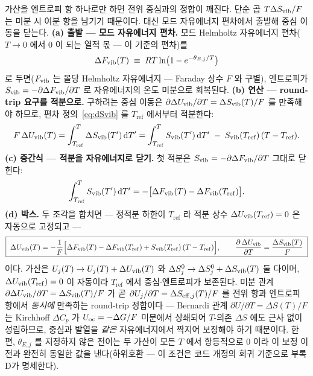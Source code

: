 가산을 엔트로피 항 하나로만 하면 전위 중심과의 정합이 깨진다. 단순 곱 $T\Delta S_{\mathrm{vib}}/F$ 는 미분 시 여분
항을 남기기 때문이다. 대신 모드 자유에너지 편차에서 출발해 중심 이동을 닫는다.
\textbf{(a) 출발 --- 모드 자유에너지 편차.} 모드 Helmholtz 자유에너지 편차($T\!\to\!0$ 에서 $0$ 이 되는
열적 몫 --- 이 기준의 편차)를
\[
\Delta F_{\mathrm{vib}}(T)\;\equiv\; RT\ln\bigl(1-e^{-\theta_{E,j}/T}\bigr)
\]
로 두면($F_{\mathrm{vib}}$ 는 몰당 Helmholtz 자유에너지 --- Faraday 상수 $F$ 와 구별), 엔트로피가 $S_{\mathrm{vib}}=-\partial
\Delta F_{\mathrm{vib}}/\partial T$ 로 자유에너지의 온도 미분으로 회복된다. \textbf{(b) 연산 --- round-trip 요구를
적분으로.} 구하려는 중심 이동은 $\partial\Delta U_{\mathrm{vib}}/\partial T=\Delta S_{\mathrm{vib}}(T)/F$ 를 만족해야 하므로,
편차 정의~\eqref{eq:dSvib} 를 $T_\mathrm{ref}$ 에서부터 적분한다:
\[
F\,\Delta U_{\mathrm{vib}}(T)=\int_{T_\mathrm{ref}}^{T}\Delta S_{\mathrm{vib}}(T')\,\mathrm{d} T'
=\int_{T_\mathrm{ref}}^{T}S_{\mathrm{vib}}(T')\,\mathrm{d} T'\;-\;S_{\mathrm{vib}}(T_\mathrm{ref})\,(T-T_\mathrm{ref}).
\]
\textbf{(c) 중간식 --- 적분을 자유에너지로 닫기.} 첫 적분은 $S_{\mathrm{vib}}=-\partial\Delta F_{\mathrm{vib}}/\partial T$
그대로 닫힌다:
\[
\int_{T_\mathrm{ref}}^{T}S_{\mathrm{vib}}(T')\,\mathrm{d} T'
=-\bigl[\Delta F_{\mathrm{vib}}(T)-\Delta F_{\mathrm{vib}}(T_\mathrm{ref})\bigr].
\]
\textbf{(d) 박스.} 두 조각을 합치면 --- 정적분 하한이 $T_\mathrm{ref}$ 라 적분 상수
$\Delta U_{\mathrm{vib}}(T_\mathrm{ref})=0$ 은 자동으로 고정되고 ---
\begin{equation}
\boxed{\;
\Delta U_{\mathrm{vib}}(T)=-\frac1F\Bigl[\Delta F_{\mathrm{vib}}(T)-\Delta F_{\mathrm{vib}}(T_\mathrm{ref})+S_{\mathrm{vib}}(T_\mathrm{ref})\,(T-T_\mathrm{ref})\Bigr],
\qquad
\frac{\partial\,\Delta U_{\mathrm{vib}}}{\partial T}=\frac{\Delta S_{\mathrm{vib}}(T)}{F}\;}
\label{eq:dUvib}
\end{equation}
이다. 가산은 $U_j(T)\to U_j(T)+\Delta U_{\mathrm{vib}}(T)$ 와 $\Delta S^0_j\to\Delta S^0_j+\Delta S_{\mathrm{vib}}(T)$ 둘 다이며,
$\Delta U_{\mathrm{vib}}(T_\mathrm{ref})=0$ 이 자동이라 $T_\mathrm{ref}$ 에서 중심$\cdot$엔트로피가 보존된다. 미분 관계
$\partial\Delta U_{\mathrm{vib}}/\partial T=\Delta S_{\mathrm{vib}}(T)/F$ 가 곧 $\partial U_j/\partial T=\Delta S_{\mathrm{eff},j}(T)/F$ 를 전위
항과 엔트로피 항에서 \emph{동시에} 만족하는 round-trip 정합이다 --- Bernardi 관계 $\partial U/\partial
T=\Delta S(T)/F$ 는 Kirchhoff $\Delta C_p$ 가 $U_{\mathrm{oc}}={-}\Delta G/F$ 미분에서 상쇄되어 $T$-의존 $\Delta S$ 에도
근사 없이 성립하므로, 중심과 발열을 \emph{같은} 자유에너지에서 짝지어 보정해야 하기 때문이다. 한편,
$\theta_{E,j}$ 를 지정하지 않은 전이는 두 가산이 모든 $T$ 에서 항등적으로 $0$ 이라 이 보정 이전과 완전히
동일한 값을 낸다(하위호환 --- 이 조건은 코드 개정의 회귀 기준으로 부록 D가 명세한다).

